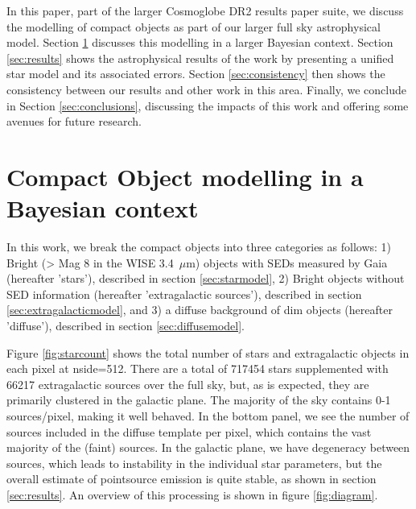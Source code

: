 \documentclass{aa}
\begin{document}
In this paper, part of the larger Cosmoglobe DR2 results paper suite, we discuss the modelling of compact objects as part of our larger full sky astrophysical model. Section \ref{sec:models} discusses this modelling in a larger Bayesian context. Section \ref{sec:results} shows the astrophysical results of the work by presenting a unified star model and its associated errors. Section \ref{sec:consistency} then shows the consistency between our results and other work in this area. Finally, we conclude in Section \ref{sec:conclusions}, discussing the impacts of this work and offering some avenues for future research.

\section{Compact Object modelling in a Bayesian context}
\label{sec:models}

In this work, we break the compact objects into three categories as follows: 1) Bright (> Mag 8 in the WISE 3.4 $\,\mu$m) objects with SEDs measured by Gaia (hereafter 'stars'), described in section \ref{sec:starmodel}, 2) Bright objects without SED information (hereafter 'extragalactic sources'), described in section \ref{sec:extragalacticmodel}, and 3) a diffuse background of dim objects (hereafter 'diffuse'), described in section \ref{sec:diffusemodel}.

Figure \ref{fig:starcount} shows the total number of stars and extragalactic objects in each pixel at nside=512. There are a total of 717454 stars supplemented with 66217 extragalactic sources over the full sky, but, as is expected, they are primarily clustered in the galactic plane. The majority of the sky contains 0-1 sources/pixel, making it well behaved. In the bottom panel, we see the number of sources included in the diffuse template per pixel, which contains the vast majority of the (faint) sources. In the galactic plane, we have degeneracy between sources, which leads to instability in the individual star parameters, but the overall estimate of pointsource emission is quite stable, as shown in section \ref{sec:results}. An overview of this processing is shown in figure \ref{fig:diagram}.
\end{document}
